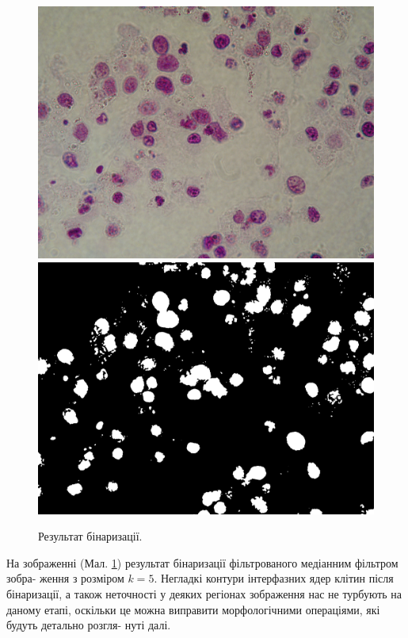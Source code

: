 \begin{figure}[t!]
	\centering
	\includegraphics[width=0.97\linewidth]{Figures/Chapter2/2a.png}
	\endminipage\hfill
	\centering	
	\includegraphics[width=0.97\linewidth]{Figures/Chapter2/2b.png}
	\endminipage\hfill	
	
	\caption{Результат бінаризації.}
	\label{fig:binarized_cells}
\end{figure}

\par
На зображенні (Мал. \ref{fig:binarized_cells}) результат бінаризації фільтрованого медіанним фільтром зобра- ження з розміром \(k = 5\). Негладкі контури інтерфазних ядер клітин після бінаризації, а також неточності у деяких регіонах зображення нас не турбують на даному етапі, оскільки це можна виправити морфологічними операціями, які будуть детально розгля- нуті далі.


